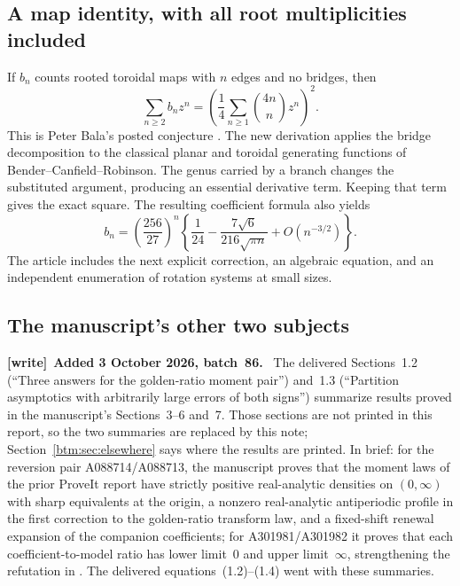 \documentclass[11pt,letterpaper]{article}
\numberwithin{equation}{section}
\theoremstyle{definition}
\theoremstyle{remark}
\newenvironment{writenote}[1][]{\par\smallskip\begingroup\small
 \noindent\textbf{[write]}\if\relax\detokenize{#1}\relax\else~\textbf{#1.}\fi\ }%
 {\par\endgroup\smallskip}
\begin{document}
\subsection{A map identity, with all root multiplicities included}

If $b_n$ counts rooted toroidal maps with $n$ edges and no bridges, then
\begin{equation}\label{btm:intro:maps}
 \sum_{n\ge2}b_nz^n
 =\left(\frac14\sum_{n\ge1}\binom{4n}{n}z^n\right)^2.
\end{equation}
This is Peter Bala's posted conjecture \cite{map:oeis343093}.
The new derivation applies the bridge decomposition to the classical
planar and toroidal generating functions of Bender--Canfield--Robinson.
The genus carried by a branch changes the substituted argument, producing
an essential derivative term. Keeping that term gives the exact square.
The resulting coefficient formula also yields
\[
 b_n=\left(\frac{256}{27}\right)^n
 \left\{\frac1{24}-\frac{7\sqrt6}{216\sqrt{\pi n}}
              +O(n^{-3/2})\right\}.
\]
The article includes the next explicit correction, an algebraic equation,
and an independent enumeration of rotation systems at small sizes.

\subsection{The manuscript's other two subjects}
\label{btm:intro:other}

\begin{writenote}[Added 3 October 2026, batch~86]
The delivered Sections~1.2 (``Three answers for the golden-ratio moment
pair'') and~1.3 (``Partition asymptotics with arbitrarily large errors of
both signs'') summarize results proved in the manuscript's Sections~3--6
and~7. Those sections are not printed in this report, so the two summaries
are replaced by this note; Section~\ref{btm:sec:elsewhere} says where the
results are printed. In brief: for the reversion pair A088714/A088713, the
manuscript proves that the moment laws of the prior ProveIt report
\cite{goldenprior} have strictly positive real-analytic densities on
$(0,\infty)$ with sharp equivalents at the origin, a nonzero real-analytic
antiperiodic profile in the first correction to the golden-ratio transform
law, and a fixed-shift renewal expansion of the companion coefficients; for
A301981/A301982 it proves that each coefficient-to-model ratio has lower
limit~$0$ and upper limit~$\infty$, strengthening the refutation in
\cite{unitaryprior}. The delivered equations~(1.2)--(1.4) went with these
summaries.
\end{writenote}
\end{document}
